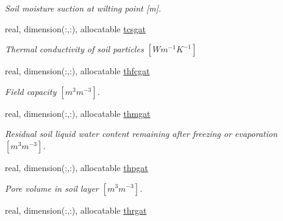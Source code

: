 \begin{DoxyCompactItemize}
\begin{DoxyCompactList}\small\item\em Soil moisture suction at wilting point \mbox{[}m\mbox{]}. \end{DoxyCompactList}\item 
\hypertarget{structclass__statevars_1_1class__gather_a28e3974e418ba07d3cc53c6fc2fe45a1}{}real, dimension(\+:,\+:), allocatable \hyperlink{structclass__statevars_1_1class__gather_a28e3974e418ba07d3cc53c6fc2fe45a1}{tcsgat}\label{structclass__statevars_1_1class__gather_a28e3974e418ba07d3cc53c6fc2fe45a1}

\begin{DoxyCompactList}\small\item\em Thermal conductivity of soil particles $[W m^{-1} K^{-1} ]$ \end{DoxyCompactList}\item 
\hypertarget{structclass__statevars_1_1class__gather_a69b8a997c17b495cd5ac0a1cc548f0b2}{}real, dimension(\+:,\+:), allocatable \hyperlink{structclass__statevars_1_1class__gather_a69b8a997c17b495cd5ac0a1cc548f0b2}{thfcgat}\label{structclass__statevars_1_1class__gather_a69b8a997c17b495cd5ac0a1cc548f0b2}

\begin{DoxyCompactList}\small\item\em Field capacity $[m^3 m^{-3} ]$. \end{DoxyCompactList}\item 
\hypertarget{structclass__statevars_1_1class__gather_acec95abae46bf5f94d79dc7be65d4e49}{}real, dimension(\+:,\+:), allocatable \hyperlink{structclass__statevars_1_1class__gather_acec95abae46bf5f94d79dc7be65d4e49}{thmgat}\label{structclass__statevars_1_1class__gather_acec95abae46bf5f94d79dc7be65d4e49}

\begin{DoxyCompactList}\small\item\em Residual soil liquid water content remaining after freezing or evaporation $[m^3 m^{-3} ]$. \end{DoxyCompactList}\item 
\hypertarget{structclass__statevars_1_1class__gather_a10b4d1962686992146a558f8c2aaab3e}{}real, dimension(\+:,\+:), allocatable \hyperlink{structclass__statevars_1_1class__gather_a10b4d1962686992146a558f8c2aaab3e}{thpgat}\label{structclass__statevars_1_1class__gather_a10b4d1962686992146a558f8c2aaab3e}

\begin{DoxyCompactList}\small\item\em Pore volume in soil layer $[m^3 m^{-3} ]$. \end{DoxyCompactList}\item 
\hypertarget{structclass__statevars_1_1class__gather_a0a45c3cfdc1b2e8cccb6312cdd616648}{}real, dimension(\+:,\+:), allocatable \hyperlink{structclass__statevars_1_1class__gather_a0a45c3cfdc1b2e8cccb6312cdd616648}{thrgat}\label{structclass__statevars_1_1class__gather_a0a45c3cfdc1b2e8cccb6312cdd616648}


\end{DoxyCompactItemize}
